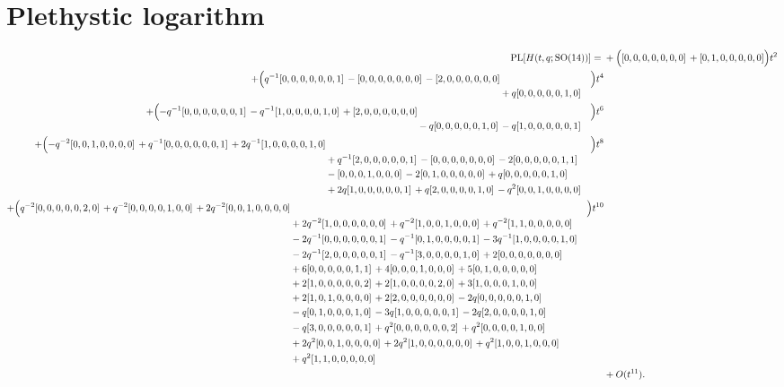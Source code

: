 \documentclass[10pt]{article}
\begin{document}
\section{Plethystic logarithm}
\[
\begin{aligned}
\operatorname{PL}[H(t,q;\mathrm{SO}(14))] ={}&
  + \Bigl([0,0,0,0,0,0,0]\,+[0,1,0,0,0,0,0]\Bigr)t^{2} \\
  + \Bigl(\begin{aligned}[t]q^{-1}[0,0,0,0,0,0,1]\,-[0,0,0,0,0,0,0]\,-[2,0,0,0,0,0,0] \\
  &{}+q[0,0,0,0,0,1,0]\end{aligned}\Bigr)t^{4} \\
  + \Bigl(\begin{aligned}[t]-q^{-1}[0,0,0,0,0,0,1]\,-q^{-1}[1,0,0,0,0,1,0]\,+[2,0,0,0,0,0,0] \\
  &{}-q[0,0,0,0,0,1,0]\,-q[1,0,0,0,0,0,1]\end{aligned}\Bigr)t^{6} \\
  + \Bigl(\begin{aligned}[t]-q^{-2}[0,0,1,0,0,0,0]\,+q^{-1}[0,0,0,0,0,0,1]\,+2q^{-1}[1,0,0,0,0,1,0] \\
  &{}+q^{-1}[2,0,0,0,0,0,1]\,-[0,0,0,0,0,0,0]\,-2[0,0,0,0,0,1,1] \\
  &{}-[0,0,0,1,0,0,0]\,-2[0,1,0,0,0,0,0]\,+q[0,0,0,0,0,1,0] \\
  &{}+2q[1,0,0,0,0,0,1]\,+q[2,0,0,0,0,1,0]\,-q^{2}[0,0,1,0,0,0,0]\end{aligned}\Bigr)t^{8} \\
  + \Bigl(\begin{aligned}[t]q^{-2}[0,0,0,0,0,2,0]\,+q^{-2}[0,0,0,0,1,0,0]\,+2q^{-2}[0,0,1,0,0,0,0] \\
  &{}+2q^{-2}[1,0,0,0,0,0,0]\,+q^{-2}[1,0,0,1,0,0,0]\,+q^{-2}[1,1,0,0,0,0,0] \\
  &{}-2q^{-1}[0,0,0,0,0,0,1]\,-q^{-1}[0,1,0,0,0,0,1]\,-3q^{-1}[1,0,0,0,0,1,0] \\
  &{}-2q^{-1}[2,0,0,0,0,0,1]\,-q^{-1}[3,0,0,0,0,1,0]\,+2[0,0,0,0,0,0,0] \\
  &{}+6[0,0,0,0,0,1,1]\,+4[0,0,0,1,0,0,0]\,+5[0,1,0,0,0,0,0] \\
  &{}+2[1,0,0,0,0,0,2]\,+2[1,0,0,0,0,2,0]\,+3[1,0,0,0,1,0,0] \\
  &{}+2[1,0,1,0,0,0,0]\,+2[2,0,0,0,0,0,0]\,-2q[0,0,0,0,0,1,0] \\
  &{}-q[0,1,0,0,0,1,0]\,-3q[1,0,0,0,0,0,1]\,-2q[2,0,0,0,0,1,0] \\
  &{}-q[3,0,0,0,0,0,1]\,+q^{2}[0,0,0,0,0,0,2]\,+q^{2}[0,0,0,0,1,0,0] \\
  &{}+2q^{2}[0,0,1,0,0,0,0]\,+2q^{2}[1,0,0,0,0,0,0]\,+q^{2}[1,0,0,1,0,0,0] \\
  &{}+q^{2}[1,1,0,0,0,0,0]\end{aligned}\Bigr)t^{10} \\
  &+ O(t^{11}).
\end{aligned}
\]
\end{document}
